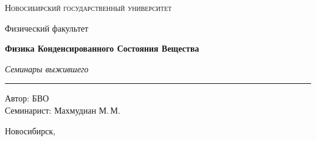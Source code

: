 \documentclass[12pt,a4paper]{report}
\begin{document}
\hypersetup{pageanchor=false}
\begin{titlepage}
    \thispagestyle{empty}

    \begin{center}
        \vspace*{1.5cm}

        {\Large\scshape Новосибирский государственный университет\par}
        \vspace{0.25cm}
        {\large Физический факультет\par}

        \vfill

        {\Huge\bfseries Физика Конденсированного Состояния Вещества\par}

        \vspace{0.45cm}

        {\Large\itshape Семинары выжившего\par}

        \vspace{0.8cm}

        \rule{0.72\linewidth}{0 pt}





        \vfill

        \begin{flushright}
            \large
            Автор: БВО\\[0.25cm]
            Семинарист: Махмудиан М.\,М.
        \end{flushright}

        \vspace{1.2cm}

        {\large Новосибирск, \the\year}

    \end{center}
\end{titlepage}
\hypersetup{pageanchor=true}

\tableofcontents
\newpage



\clearpage

\clearpage

\clearpage

\clearpage

\clearpage

\clearpage

\clearpage

\clearpage
\end{document}
